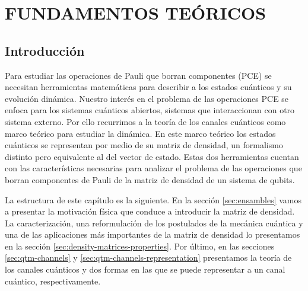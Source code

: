 \chapter{FUNDAMENTOS TEÓRICOS}
\section{Introducción} %

Para estudiar las operaciones de Pauli que borran componentes (PCE)
se necesitan herramientas matemáticas para describir a los estados 
cuánticos y su evolución dinámica. Nuestro
interés en el problema de 
las operaciones PCE se enfoca para los sistemas cuánticos abiertos, 
sistemas que interaccionan con otro sistema externo. Por ello recurrimos
a la teoría de los canales cuánticos como marco teórico para estudiar 
la dinámica. En este marco teórico los estados cuánticos se representan
por medio de su matriz de densidad, un formalismo distinto pero equivalente
al del vector de estado. Estas dos herramientas cuentan con las características 
necesarias para analizar el problema de las operaciones que borran
componentes de Pauli de la matriz de densidad de un sistema de qubits.

La estructura de este capítulo es la siguiente. En la sección \ref{sec:ensambles}
vamos a presentar la motivación física que conduce a introducir
la matriz de densidad. La caracterización, una reformulación de los 
postulados de la mecánica cuántica y una de las aplicaciones más 
importantes de la matriz de densidad lo presentamos en la sección
\ref{sec:density-matrices-properties}. Por último, 
en las secciones \ref{sec:qtm-channels}
y \ref{sec:qtm-channels-representation} presentamos la teoría de los
canales cuánticos y dos formas en las que se puede representar
a un canal cuántico, respectivamente.
